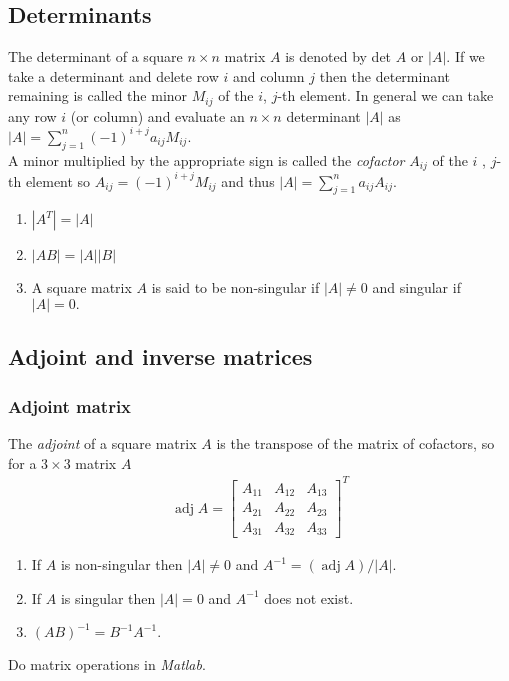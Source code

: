 \documentclass[12pt,a4paper,fleqn]{mycalc}
\begin{document}
	\subsection{Determinants}
	The determinant of a square \( n \times n \) matrix \( A \) is denoted by det \( A \) or \( | A |. \) If we take a determinant and delete row \( i \) and column \( j \) then the determinant remaining is called the minor \( M_{ij} \) of the \( i \), \( j \)-th element. In general we can take any row \( i \) (or column) and evaluate an \( n \times n \) determinant \( | A | \) as \( |A|=\sum_{j=1}^{n}(-1)^{i+j}a_{ij}M_{ij}. \)\\
	A minor multiplied by the appropriate sign is called the \emph{cofactor} \( A_{ij} \) of the \( i \) , \( j \)-th element so \( A_{ij} = (-1)^{i+j} M_{ij} \) and thus \( |A|=\sum_{j=1}^{n}a_{ij}A_{ij}. \)
	\begin{tcolorbox}[title={Some useful properties}]
		\begin{enumerate}[i]
			\item \( |A^{T}|=|A| \)
			\item \( |AB|=|A||B| \)
			\item A square matrix \( A \) is said to be non-singular if \( | A | \neq 0 \) and singular if \( | A | = 0. \)
		\end{enumerate}
	\end{tcolorbox}
	\subsection{Adjoint and inverse matrices}
	\subsubsection{Adjoint matrix}
	The \emph{adjoint} of a square matrix \( A \) is the transpose of the matrix of cofactors, so for a \( 3 \times 3 \) matrix \( A \)
	\begin{align*}
	\operatorname{adj} A=\begin{bmatrix}
	A_{11} & A_{12} & A_{13}\\
	A_{21} & A_{22} & A_{23}\\
	A_{31} & A_{32} & A_{33}
	\end{bmatrix}^{T}
	\end{align*}
	\begin{tcolorbox}[title={Properties}]
		\begin{enumerate}[i]
			\item If \( A \) is non-singular then \( |A | \neq 0 \) and \( A^{-1} = (\operatorname{adj} A)/|A |. \)
			\item If \( A \) is singular then \( |A | = 0 \) and \( A^{-1} \) does not exist.
			\item \( (AB)^{-1} = B^{-1}A^{-1}. \)
		\end{enumerate}
	\end{tcolorbox}
	\begin{tcolorbox}[title={Matlab Practice}]
		Do matrix operations in \emph{Matlab}.
	\end{tcolorbox}
\end{document}
